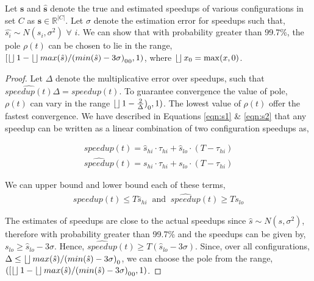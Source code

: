 \begin{thm}
  Let $\mathbf{s}$ and $\hat{\mathbf{s}}$ denote the true and estimated speedups of various configurations in set $C$ as $\mathbf{s} \in \mathbb{R}^{|C|}$. Let $\sigma$ denote the
  estimation error for speedups such that, $\hat{s_i} \sim
  N(s_i, \sigma^2)$ $\forall$ $i$. We can show that with probability
  greater than 99.7\%, the pole $\rho(t)$ can be chosen to lie in the range, $[\operatorname*{\lfloor\rfloor}{1- \operatorname*{\lfloor\rfloor}{max(\hat{s})/(min(\hat{s}) -  3\sigma)}_0}_0, 1)$, where $\operatorname*{\lfloor\rfloor}{x}_0 = \max(x,0)$.
\end{thm}

\begin{proof}
Let $\Delta$ denote the multiplicative error over speedups, such that $ \widehat{speedup(t)}\Delta = speedup(t) $. To
guarantee convergence the value of pole, $\rho(t)$ can vary in the range
$\operatorname*{\lfloor\rfloor}{1-\frac{2}{\Delta})}_0, 1)$\cite{ICSE2014}. The lowest value of $\rho(t)$ offer the fastest convergence. We have described in Equations \ref{eqn:s1} \& \ref{eqn:s2} that any speedup can be written as a linear combination of two configuration speedups as,

\begin{align}
speedup(t) = \hat{s}_{hi} \cdot \tau_{hi} + \hat{s}_{lo} \cdot (T - \tau_{hi})
\end{align}
\begin{align}
\widehat{speedup}(t) = s_{hi} \cdot \tau_{hi} + s_{lo} \cdot (T - \tau_{hi})
\end{align}

We can upper bound and lower bound each of these terms,
\begin{align}
speedup(t) \leq T \hat{s}_{hi} \;\; \text{and} \;\; \widehat{speedup}(t) \geq T s_{lo}
\end{align}

The estimates of speedups are close to the actual speedups since
$\hat{s} \sim N(s, \sigma^2)$, therefore with probability greater
than 99.7\% and the speedups can be given by, $s_{lo} \geq
\hat{s}_{lo} - 3 \sigma$. Hence, $\widehat{speedup}(t) \geq T
(\hat{s}_{lo} -3 \sigma)$. Since, over all configurations, $\Delta \leq
\operatorname*{\lfloor\rfloor}{max(\hat{s})/(min(\hat{s}) - 3\sigma)}_0$,  we can choose the pole from the range,  $([\operatorname*{\lfloor\rfloor}{1- \operatorname*{\lfloor\rfloor}{max(\hat{s})/(min(\hat{s}) - 3\sigma)}_0}_0, 1)$.


\end{proof}
